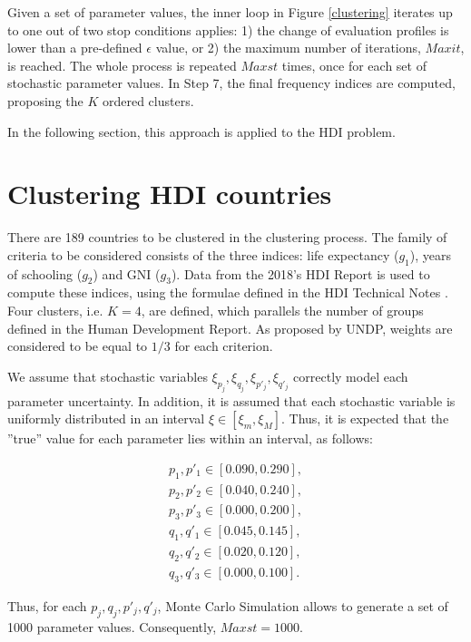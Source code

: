 \documentclass[]{elsarticle}
\theoremstyle{definition}
\begin{document}
Given a set of parameter values, the inner loop in Figure \ref{clustering} iterates up to one out of two stop conditions applies: 1) the change of evaluation profiles is  lower than a pre-defined $\epsilon$ value, or 2) the maximum number of iterations, $Maxit$,  is reached.  The whole process is repeated $Maxst$ times, once for each set of stochastic parameter values. In Step 7, the final frequency indices are computed, proposing the $K$ ordered clusters.


  

In the following section, this approach is applied to the HDI problem.





\section{Clustering HDI countries}\label{application}

There are 189 countries to be clustered in the clustering process. The family of criteria to be considered consists of the three indices: life expectancy ($g_1$), years of schooling ($g_2$) and GNI  ($g_3$).  Data from the 2018's HDI Report is used to compute these indices, using the formulae defined in the HDI Technical Notes \citep{UNDP2019}. Four clusters, i.e. $K=4$, are defined, which parallels the number of groups defined in the Human Development Report.  As proposed by UNDP, weights are considered to be equal to $1/3$ for each criterion.

We assume that stochastic variables $\xi_{p_j},\xi_{q_j},\xi_{p'_j},\xi_{q'_j}$ correctly model each parameter uncertainty. In addition, it is assumed that each stochastic variable is uniformly distributed in an interval  $\xi \in [\xi_m, \xi_M]$. Thus, it is expected that the ''true'' value for each parameter lies within an interval, as follows:

\begin{eqnarray}
p_1,p'_1 \in [0.090, 0.290], \nonumber\\
p_2,p'_2 \in [0.040, 0.240], \nonumber\\
p_3,p'_3 \in [0.000, 0.200], \nonumber\\
q_1,q'_1 \in [0.045, 0.145], \nonumber\\
q_2,q'_2 \in [0.020, 0.120], \nonumber\\
q_3,q'_3 \in [0.000, 0.100]. \nonumber
\end{eqnarray}

\noindent
Thus, for each $p_j, q_j, p'_j, q'_j$, Monte Carlo Simulation allows to generate a set of 1000 parameter values. Consequently, $Maxst=1000$.  
\end{document}

